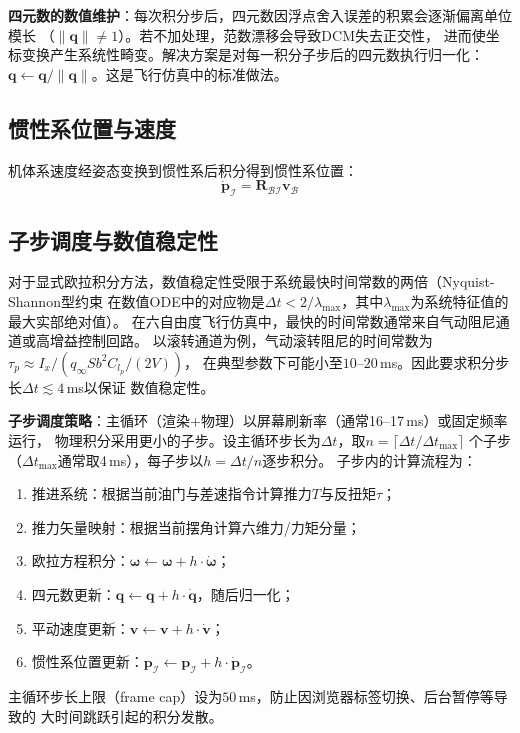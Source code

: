 \documentclass[a4paper,12pt]{ctexart}
\theoremstyle{plain}
\theoremstyle{definition}
\begin{document}
\textbf{四元数的数值维护}：每次积分步后，四元数因浮点舍入误差的积累会逐渐偏离单位模长
（$\|\bm{q}\| \neq 1$）。若不加处理，范数漂移会导致DCM失去正交性，
进而使坐标变换产生系统性畸变。解决方案是对每一积分子步后的四元数执行归一化：
$\bm{q} \leftarrow \bm{q} / \|\bm{q}\|$。这是飞行仿真中的标准做法。

\subsection{惯性系位置与速度}

机体系速度经姿态变换到惯性系后积分得到惯性系位置：
\begin{equation}
    \dot{\bm{p}}_{\mathcal{I}} = \bm{R}_{\mathcal{B}\mathcal{I}} \bm{v}_{\mathcal{B}}
    \label{eq:position_integration}
\end{equation}

\subsection{子步调度与数值稳定性}

对于显式欧拉积分方法，数值稳定性受限于系统最快时间常数的两倍（Nyquist-Shannon型约束
在数值ODE中的对应物是$\Delta t < 2/\lambda_{\max}$，其中$\lambda_{\max}$为系统特征值的最大实部绝对值）。
在六自由度飞行仿真中，最快的时间常数通常来自气动阻尼通道或高增益控制回路。
以滚转通道为例，气动滚转阻尼的时间常数为$\tau_p \approx I_x / (q_\infty S b^2 C_{l_p} / (2V))$，
在典型参数下可能小至$10$--$20$\,ms。因此要求积分步长$\Delta t \lesssim 4$\,ms以保证
数值稳定性。

\textbf{子步调度策略}：主循环（渲染+物理）以屏幕刷新率（通常16--17\,ms）或固定频率运行，
物理积分采用更小的子步。设主循环步长为$\Delta t$，取$n = \lceil \Delta t / \Delta t_{\max} \rceil$
个子步（$\Delta t_{\max}$通常取4\,ms），每子步以$h = \Delta t / n$逐步积分。
子步内的计算流程为：
\begin{enumerate}[label=(\arabic*)]
    \item 推进系统：根据当前油门与差速指令计算推力$T$与反扭矩$\tau$；
    \item 推力矢量映射：根据当前摆角计算六维力/力矩分量；
    \item 欧拉方程积分：$\bm{\omega} \leftarrow \bm{\omega} + h \cdot \dot{\bm{\omega}}$；
    \item 四元数更新：$\bm{q} \leftarrow \bm{q} + h \cdot \dot{\bm{q}}$，随后归一化；
    \item 平动速度更新：$\bm{v} \leftarrow \bm{v} + h \cdot \dot{\bm{v}}$；
    \item 惯性系位置更新：$\bm{p}_{\mathcal{I}} \leftarrow \bm{p}_{\mathcal{I}} + h \cdot \dot{\bm{p}}_{\mathcal{I}}$。
\end{enumerate}
主循环步长上限（frame cap）设为$50$\,ms，防止因浏览器标签切换、后台暂停等导致的
大时间跳跃引起的积分发散。
\end{document}
